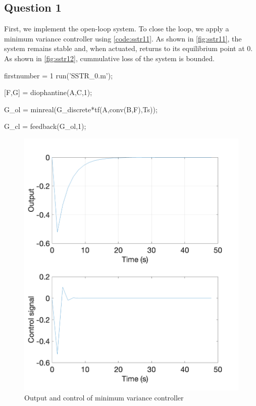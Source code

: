\FloatBarrier
\subsection{Question 1}
First, we implement the open-loop system. To close the loop, we apply a minimum variance controller using \autoref{code:sstr11}. As shown in \autoref{fig:sstr11}, the system remains stable and, when actuated, returns to its equilibrium point at $0$. As shown in \autoref{fig:sstr12}, cummulative loss of the system is bounded.

\begin{code}
	\begin{matlabcode}{firstnumber = 1}
run('SSTR_0.m');

[F,G] = diophantine(A,C,1);

G_ol = minreal(G_discrete*tf(A,conv(B,F),Ts));

G_cl = feedback(G_ol,1);
	\end{matlabcode}
	\label{code:sstr11}
\end{code}

\begin{figure}
	\centering
	\includegraphics[width=\textwidth]{images/sstr11.png}
	\caption{Output and control of minimum variance controller}
	\label{fig:sstr11}
\end{figure}

